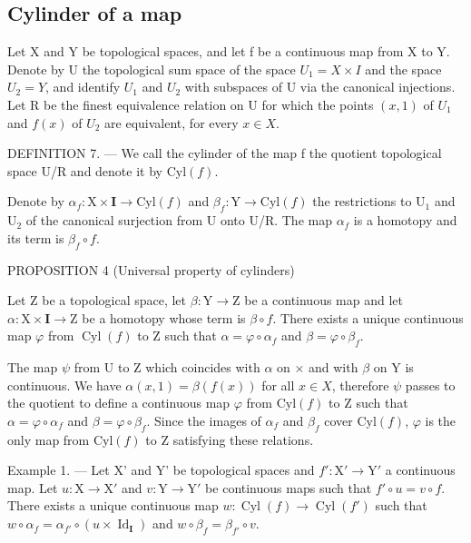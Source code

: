 \subsection{Cylinder of a map}

Let X and Y be topological spaces, and let f be a continuous map from X to Y. Denote by U the topological sum space of the space \(U_{1} = X \times I\) and the space \(U_{2} = Y\), and identify \(U_{1}\) and \(U_{2}\) with subspaces of U via the canonical injections. Let R be the finest equivalence relation on U for which the points \((x,1)\) of \(U_{1}\) and \(f(x)\) of \(U_{2}\) are equivalent, for every \(x \in X\).

DEFINITION 7. --- We call the cylinder of the map f the quotient topological space U/R and denote it by \(\mathrm{Cyl}(f)\).

Denote by \(\alpha_{f}\colon\mathrm{X}\times\mathbf{I}\to\mathrm{Cyl}(f)\) and \(\beta_{f}\colon\mathrm{Y}\to\mathrm{Cyl}(f)\) the restrictions to \(\mathrm{U}_{1}\) and \(\mathrm{U}_{2}\) of the canonical surjection from U onto U/R. The map \(\alpha_{f}\) is a homotopy and its term is \(\beta_{f}\circ f\).

PROPOSITION 4 (Universal property of cylinders)

Let Z be a topological space, let \(\beta: \mathrm{Y} \to \mathrm{Z}\) be a continuous map and let \(\alpha: \mathrm{X} \times \mathbf{I} \to \mathrm{Z}\) be a homotopy whose term is \(\beta \circ f\). There exists a unique continuous map \(\varphi\) from \(\operatorname{Cyl}(f)\) to Z such that \(\alpha = \varphi \circ \alpha_f\) and \(\beta = \varphi \circ \beta_f\).

The map \(\psi\) from U to Z which coincides with \(\alpha\) on \(\times\) and with \(\beta\) on Y is continuous. We have \(\alpha(x,1)=\beta(f(x))\) for all \(x\in X\), therefore \(\psi\) passes to the quotient to define a continuous map \(\varphi\) from \(\mathrm{Cyl}(f)\) to Z such that \(\alpha=\varphi\circ\alpha_{f}\) and \(\beta=\varphi\circ\beta_{f}\). Since the images of \(\alpha_{f}\) and \(\beta_{f}\) cover \(\mathrm{Cyl}(f)\), \(\varphi\) is the only map from \(\mathrm{Cyl}(f)\) to Z satisfying these relations.

Example 1. --- Let X' and Y' be topological spaces and \(f': \mathrm{X}' \to \mathrm{Y}'\) a continuous map. Let \(u: \mathrm{X} \to \mathrm{X}'\) and \(v: \mathrm{Y} \to \mathrm{Y}'\) be continuous maps such that \(f' \circ u = v \circ f\). There exists a unique continuous map \(w: \operatorname{Cyl}(f) \to \operatorname{Cyl}(f')\) such that \(w \circ \alpha_f = \alpha_{f'} \circ (u \times \operatorname{Id}_\mathbf{I})\) and \(w \circ \beta_f = \beta_{f'} \circ v\).

